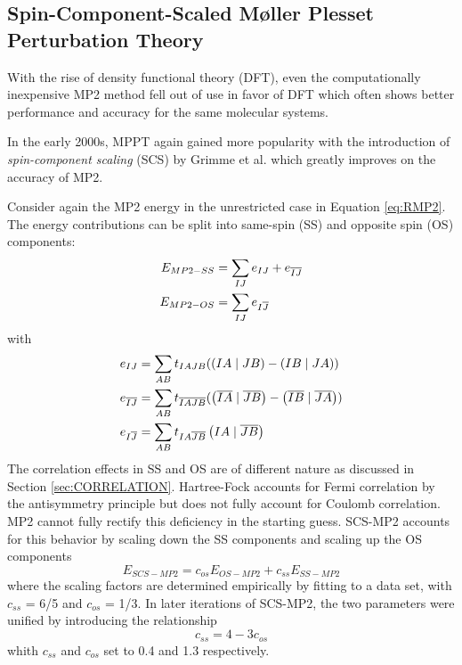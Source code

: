 \subsection{Spin-Component-Scaled M{\o}ller Plesset Perturbation Theory}

With the rise of density functional theory (DFT), even the computationally inexpensive MP2 method fell out of use in favor of DFT which often shows better performance and accuracy for the same molecular systems.

In the early 2000s, MPPT again gained more popularity with the introduction of \emph{spin-component scaling} (SCS) by Grimme et al. \cite{Gri2003,Gri2012} which greatly improves on the accuracy of MP2.

Consider again the MP2 energy in the unrestricted case in Equation \ref{eq:RMP2}. The energy contributions can be split into same-spin (SS) and opposite spin (OS) components:
\begin{align}
E_{MP2-SS} &= \sum_{IJ} e_{IJ} + e_{\overline{I}\overline{J}} \\
E_{MP2-OS} &= \sum_{IJ} e_{I\overline{J}} 
\end{align}
\noindent with
\begin{align}
e_{IJ} &= \sum_{AB} t_{IAJB} (\left( IA \mid JB \right) - \left( IB \mid JA \right)) \\
e_{\overline{I}\overline{J}} &= \sum_{AB} t_{\overline{I}\overline{A}\overline{J}\overline{B}} (\left( \overline{I}\overline{A} \mid \overline{J}\overline{B} \right) - \left( \overline{I}\overline{B} \mid \overline{J}\overline{A} \right)) \\
e_{I\overline{J}} &= \sum_{AB} t_{IA\overline{J}\overline{B}} \left( IA \mid \overline{J}\overline{B} \right)  
\end{align}
The correlation effects in SS and OS are of different nature as discussed in Section \ref{sec:CORRELATION}. Hartree-Fock accounts for Fermi correlation by the antisymmetry principle but does not fully account for Coulomb correlation. MP2 cannot fully rectify this deficiency in the starting guess. SCS-MP2 accounts for this behavior by scaling down the SS components and scaling up the OS components
\begin{equation}
E_{SCS-MP2} = c_{os} E_{OS-MP2} + c_{ss} E_{SS-MP2}
\end{equation}
\noindent where the scaling factors are determined empirically by fitting to a data set, with $c_{ss}$ = 6/5 and $c_{os}$ = 1/3. In later iterations of SCS-MP2, the two parameters were unified by introducing the relationship
\begin{equation}
c_{ss} = 4 - 3c_{os}
\end{equation}
\noindent whith $c_{ss}$ and $c_{os}$ set to 0.4 and 1.3 respectively.

